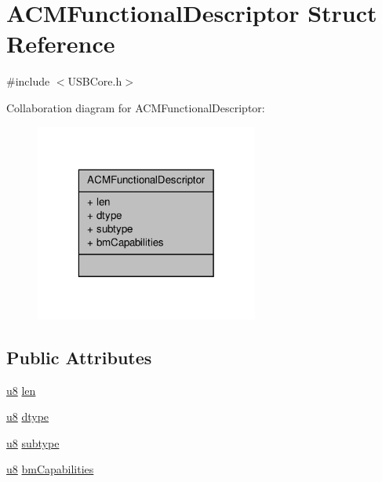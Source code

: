\hypertarget{struct_a_c_m_functional_descriptor}{\section{A\-C\-M\-Functional\-Descriptor Struct Reference}
\label{struct_a_c_m_functional_descriptor}
}


{\ttfamily \#include $<$U\-S\-B\-Core.\-h$>$}



Collaboration diagram for A\-C\-M\-Functional\-Descriptor\-:
\nopagebreak
\begin{figure}[H]
\begin{center}
\leavevmode
\includegraphics[width=208pt]{struct_a_c_m_functional_descriptor__coll__graph}
\end{center}
\end{figure}
\subsection*{Public Attributes}
\begin{DoxyCompactItemize}
\item 
\hyperlink{_platform_8h_aed742c436da53c1080638ce6ef7d13de}{u8} \hyperlink{struct_a_c_m_functional_descriptor_aaeda91f387fb2185f703edcbec992398}{len}
\item 
\hyperlink{_platform_8h_aed742c436da53c1080638ce6ef7d13de}{u8} \hyperlink{struct_a_c_m_functional_descriptor_aefd5ee02fa9ef19cc96ee191e90a1c90}{dtype}
\item 
\hyperlink{_platform_8h_aed742c436da53c1080638ce6ef7d13de}{u8} \hyperlink{struct_a_c_m_functional_descriptor_a9b7727390ce66baee8b7175dbab62a81}{subtype}
\item 
\hyperlink{_platform_8h_aed742c436da53c1080638ce6ef7d13de}{u8} \hyperlink{struct_a_c_m_functional_descriptor_a218920f326b1c8f3faacd4a9592f30d8}{bm\-Capabilities}
\end{DoxyCompactItemize}


